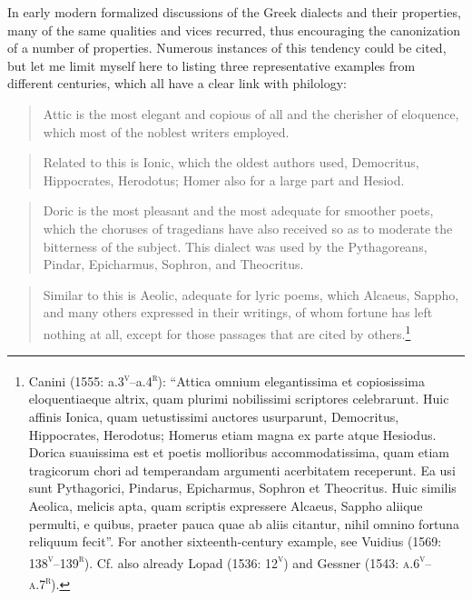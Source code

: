 In early modern formalized discussions of the Greek dialects and their properties, many of the same qualities and vices recurred, thus encouraging the canonization of a number of properties. Numerous instances of this tendency could be cited, but let me limit myself here to listing three representative examples from different centuries, which all have a clear link with philology:

\begin{quote}
Attic is the most elegant and copious of all and the cherisher of eloquence, which most of the noblest writers employed.
\end{quote}

\begin{quote}
Related to this is Ionic, which the oldest authors used, Democritus, Hippocrates, Herodotus; Homer also for a large part and Hesiod.
\end{quote}

\begin{quote}
Doric is the most pleasant and the most adequate for smoother poets, which the choruses of tragedians have also received so as to moderate the bitterness of the subject. This dialect was used by the Pythagoreans, Pindar, Epicharmus, Sophron, and Theocritus.
\end{quote}

\begin{quote}
Similar to this is Aeolic, adequate for lyric poems, which Alcaeus, Sappho, and many others expressed in their writings, of whom fortune has left nothing at all, except for those passages that are cited by others.\footnote{Canini (1555: a.3\textsc{\textsuperscript{v}}–a.4\textsc{\textsuperscript{r}}): “Attica omnium elegantissima et copiosissima eloquentiaeque altrix, quam plurimi nobilissimi scriptores celebrarunt. Huic affinis Ionica, quam uetustissimi auctores usurparunt, Democritus, Hippocrates, Herodotus; Homerus etiam magna ex parte atque Hesiodus. Dorica suauissima est et poetis mollioribus accommodatissima, quam etiam tragicorum chori ad temperandam argumenti acerbitatem receperunt. Ea usi sunt Pythagorici, Pindarus, Epicharmus, Sophron et Theocritus. Huic similis Aeolica, melicis apta, quam scriptis expressere Alcaeus, Sappho aliique permulti, e quibus, praeter pauca quae ab aliis citantur, nihil omnino fortuna reliquum fecit”. For another sixteenth-century example, see Vuidius (1569: 138\textsc{\textsuperscript{v}}–139\textsc{\textsuperscript{r}}). Cf. also already Lopad (1536: 12\textsc{\textsuperscript{v}}) and Gessner (1543: \textsc{a.6}\textsc{\textsuperscript{v}}\textsc{–a.7}\textsc{\textsuperscript{r}}).}
\end{quote}

